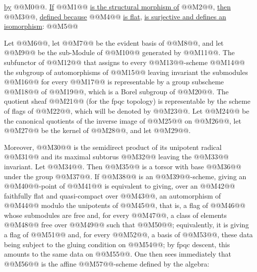 
\uline{by} @@M0@@. \uline{If} @@M1@@ \uline{is the structural morphism of} @@M2@@, \uline{then} @@M3@@, \uline{defined because} @@M4@@ \uline{is flat}, \uline{is surjective and defines an isomorphism}:
@@M5@@

Let @@M6@@, let @@M7@@ be the evident basis of @@M8@@, and let @@M9@@ be the sub-Module of @@M10@@ generated by @@M11@@. The subfunctor of @@M12@@ that assigns to every @@M13@@-scheme @@M14@@ the subgroup of automorphisms of @@M15@@ leaving invariant the submodules @@M16@@ for every @@M17@@ is representable by a group subscheme @@M18@@ of @@M19@@, which is a Borel subgroup of @@M20@@. The quotient sheaf @@M21@@ (for the fpqc topology) is representable by the scheme of flags of @@M22@@, which will be denoted by @@M23@@. Let @@M24@@ be the canonical quotients of the inverse image of @@M25@@ on @@M26@@, let @@M27@@ be the kernel of @@M28@@, and let @@M29@@.

Moreover, @@M30@@ is the semidirect product of its unipotent radical @@M31@@ and its maximal subtorus @@M32@@ leaving the @@M33@@ invariant. Let @@M34@@. Then @@M35@@ is a torsor with base @@M36@@ under the group @@M37@@. If @@M38@@ is an @@M39@@-scheme, giving an @@M40@@-point of @@M41@@ is equivalent to giving, over an @@M42@@ faithfully flat and quasi-compact over @@M43@@, an automorphism of @@M44@@ modulo the unipotents of @@M45@@, that is, a flag of @@M46@@ whose submodules are free and, for every @@M47@@, a class of elements @@M48@@ free over @@M49@@ such that @@M50@@; equivalently, it is giving a flag of @@M51@@ and, for every @@M52@@, a basis of @@M53@@, these data being subject to the gluing condition on @@M54@@; by fpqc descent, this amounts to the same data on @@M55@@. One then sees immediately that @@M56@@ is the affine @@M57@@-scheme defined by the algebra:


